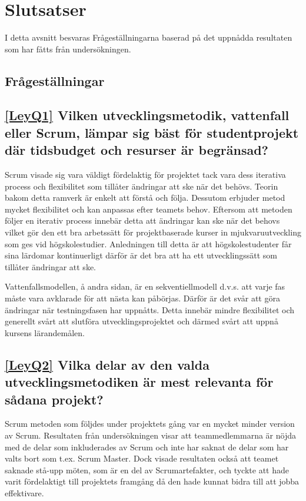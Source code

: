 \section{Slutsatser}
\label{sec:Lieth_Wahid-conclusion}
I detta avsnitt besvaras Frågeställningarna baserad på det uppnådda resultaten som har fåtts från undersökningen.
\subsection{Frågeställningar}

\subsection*{\ref{LeyQ1} Vilken utvecklingsmetodik, vattenfall eller Scrum, lämpar sig bäst för studentprojekt där tidsbudget och resurser är begränsad?}
Scrum visade sig vara väldigt fördelaktig för projektet tack vara dess iterativa process och flexibilitet som tillåter ändringar att ske när det behövs. Teorin bakom detta ramverk är enkelt att förstå och följa. Dessutom erbjuder metod mycket flexibilitet och kan anpassas efter teamets behov. Eftersom att metoden följer en iterativ process innebär detta att ändringar kan ske när det behovs vilket gör den ett bra arbetssätt för projektbaserade kurser in mjukvaruutveckling som ges vid högskolestudier. Anledningen till detta är att högskolestudenter får sina lärdomar kontinuerligt därför är det bra att ha ett utvecklingssätt som tillåter ändringar att ske.
	
Vattenfallsmodellen, å andra sidan, är en sekventiellmodell d.v.s. att varje fas måste vara avklarade för att nästa kan påbörjas. Därför är det svår att göra ändringar när testningsfasen har uppnåtts. Detta innebär mindre flexibilitet och generellt svårt att slutföra utvecklingsprojektet och därmed svårt att uppnå kursens lärandemålen.
		
\subsection*{\ref{LeyQ2} Vilka delar av den valda utvecklingsmetodiken är mest relevanta för sådana projekt? }
Scrum metoden som följdes under projektets gång var en mycket minder version av Scrum. Resultaten från undersökningen visar att teammedlemmarna är nöjda med de delar som inkluderades av Scrum och inte har saknat de delar som har valts bort som t.ex. Scrum Master. Dock visade resultaten också att teamet saknade stå-upp möten, som är en del av Scrumartefakter, och tyckte att hade varit fördelaktigt till projektets framgång då den hade kunnat bidra till att jobba effektivare. 